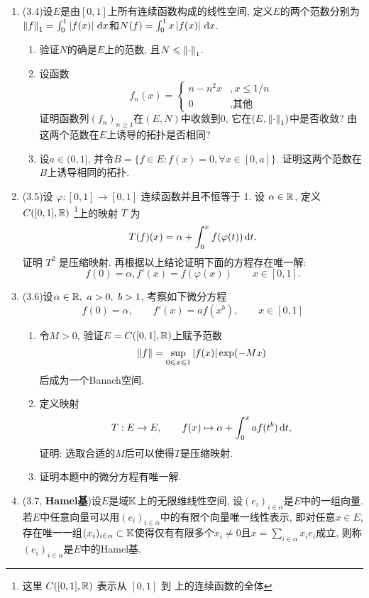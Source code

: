 \begin{enumerate}[label=\textbf{\arabic*.}, ref=\arabic*]
	\item (3.4)设$ E $是由$ [0,1] $上所有连续函数构成的线性空间, 定义$ E $的两个范数分别为$ \left\| f \right\|_1=\int_0^1\left| f(x) \right| \,\mathrm{d} x $和$ N(f)=\int_0^1x\left| f(x) \right| \,\mathrm{d} x $.
		\begin{enumerate}[(1)]
		\item 验证$ N $的确是$ E $上的范数, 且$ N\leqslant\left\| \cdot \right\|_1 $.
		\item 设函数
		\[
		f_n(x)=\begin{cases}
		n-n^2x & ,x\leqslant 1/n\\
		0 & ,\text{其他}
		\end{cases}
		\]
		证明函数列$ (f_n)_{n\geqslant 1} $在$ (E,N) $中收敛到0, 它在$ (E,\left\| \cdot \right\|_1) $中是否收敛? 由这两个范数在$ E $上诱导的拓扑是否相同?
		\item 设$ a\in(0,1] $, 并令$ B=\{ f\in E : f(x)=0, \forall x\in[0,a] \} $. 证明这两个范数在$ B $上诱导相同的拓扑. 
		\end{enumerate}
	\item (3.5)设 $ \varphi:[0, 1]\to [0, 1] $ 连续函数并且不恒等于 1. 设 $ \alpha\in\mathbb{R} $, 定义 $ C([0, 1],\mathbb{R}) $ \footnote{这里 $ C([0, 1],\mathbb{R}) $ 表示从 $ [0, 1] $ 到 \R 上的连续函数的全体 }上的映射 $ T $ 为
		\[
			T(f)(x)=\alpha+\int_{0}^{x}f(\varphi(t))\,\mathrm{d} t.
		\]
		证明 $ T^2 $ 是压缩映射. 再根据以上结论证明下面的方程存在唯一解: 
		\begin{equation}
			f(0)=\alpha, f'(x)=f(\varphi(x))\qquad x\in[0, 1].
		\end{equation}
	\item (3.6)设$ \alpha\in\R,\ a>0,\ b>1 $, 考察如下微分方程
		\begin{equation}
		f(0)=\alpha,\qquad f'(x)=af(x^b),\qquad x\in[0,1]
		\end{equation}
		\begin{enumerate}[(1)]
		\item 令$ M>0 $, 验证$ E=C([0,1],\mathbb{R}) $上赋予范数
		\[
		\left\| f \right\|=\sup_{0\leqslant x\leqslant 1}\left| f(x) \right| \exp(-Mx)
		\]
		后成为一个Banach空间.
		\item 定义映射
		\[
		T : E\to E,\qquad f(x)\mapsto\alpha+\int_0^x af(t^b)\,\mathrm{d} t,
		\]
		证明: 选取合适的$ M $后可以使得$ T $是压缩映射.
		\item 证明本题中的微分方程有唯一解. 
		\end{enumerate}
	\item (3.7, \textbf{Hamel基})设$ E $是域$ \mathbb{K} $上的无限维线性空间, 设$ (e_i)_{i\in\alpha} $是$ E $中的一组向量. 若$ E $中任意向量可以用$ (e_i)_{i\in\alpha} $中的有限个向量唯一线性表示, 即对任意$ x\in E $, 存在唯一一组$ (x_i)_{i\in\alpha}\subset\mathbb{K} $使得仅有有限多个$ x_i\ne 0 $且$ x=\sum\limits_{i\in\alpha}x_ie_i $成立, 则称$ (e_i)_{i\in\alpha} $是$ E $中的Hamel基.

\end{enumerate}
